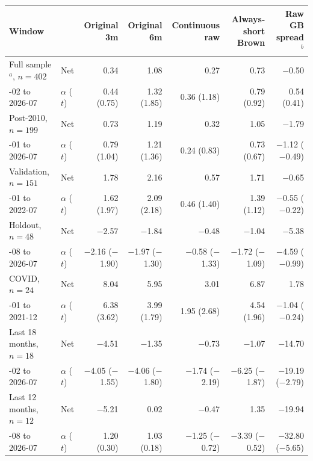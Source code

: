 \begin{tabular}{@{}llrrrrr@{}}
\toprule
Window & & Original 3m & Original 6m & Continuous raw & Always-short Brown & Raw GB spread$^{b}$ \\
\midrule
Full sample$^{a}$, $n=402$ & Net & 0.34 & 1.08 & 0.27 & 0.73 & $-$0.50 \\
\quad 1993-02 to 2026-07 & $\alpha$ ($t$) & 0.44 (0.75) & 1.32 (1.85) & 0.36 (1.18) & 0.79 (0.92) & 0.54 (0.41) \\
\addlinespace[1pt]
Post-2010, $n=199$ & Net & 0.73 & 1.19 & 0.32 & 1.05 & $-$1.79 \\
\quad 2010-01 to 2026-07 & $\alpha$ ($t$) & 0.79 (1.04) & 1.21 (1.36) & 0.24 (0.83) & 0.73 (0.67) & $-$1.12 ($-$0.49) \\
\addlinespace[1pt]
Validation, $n=151$ & Net & 1.78 & 2.16 & 0.57 & 1.71 & $-$0.65 \\
\quad 2010-01 to 2022-07 & $\alpha$ ($t$) & 1.62 (1.97) & 2.09 (2.18) & 0.46 (1.40) & 1.39 (1.12) & $-$0.55 ($-$0.22) \\
\addlinespace[1pt]
Holdout, $n=48$ & Net & $-$2.57 & $-$1.84 & $-$0.48 & $-$1.04 & $-$5.38 \\
\quad 2022-08 to 2026-07 & $\alpha$ ($t$) & $-$2.16 ($-$1.90) & $-$1.97 ($-$1.30) & $-$0.58 ($-$1.33) & $-$1.72 ($-$1.09) & $-$4.59 ($-$0.99) \\
\addlinespace[1pt]
COVID, $n=24$ & Net & 8.04 & 5.95 & 3.01 & 6.87 & 1.78 \\
\quad 2020-01 to 2021-12 & $\alpha$ ($t$) & 6.38 (3.62) & 3.99 (1.79) & 1.95 (2.68) & 4.54 (1.96) & $-$1.04 ($-$0.24) \\
\addlinespace[1pt]
Last 18 months, $n=18$ & Net & $-$4.51 & $-$1.35 & $-$0.73 & $-$1.07 & $-$14.70 \\
\quad 2025-02 to 2026-07 & $\alpha$ ($t$) & $-$4.05 ($-$1.55) & $-$4.06 ($-$1.80) & $-$1.74 ($-$2.19) & $-$6.25 ($-$1.87) & $-$19.19 ($-$2.79) \\
\addlinespace[1pt]
Last 12 months, $n=12$ & Net & $-$5.21 & 0.02 & $-$0.47 & 1.35 & $-$19.94 \\
\quad 2025-08 to 2026-07 & $\alpha$ ($t$) & 1.20 (0.30) & 1.03 (0.18) & $-$1.25 ($-$0.72) & $-$3.39 ($-$0.52) & $-$32.80 ($-$5.65) \\
\bottomrule
\end{tabular}

